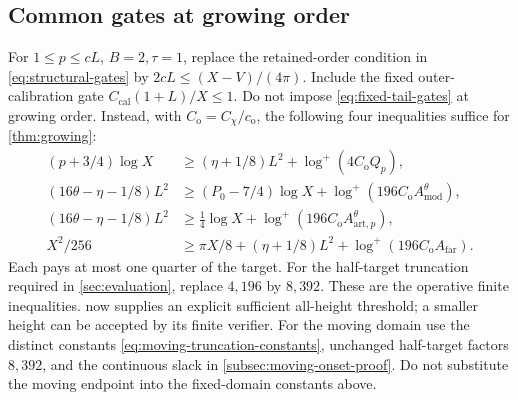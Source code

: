 \subsection{Common gates at growing order}
\label{app:growing-gates}
For \(1\le p\le cL\), \(B=2,\tau=1\), replace the retained-order
condition in \eqref{eq:structural-gates} by
\(2cL\le(X-V)/(4\pi)\).
Include the fixed outer-calibration gate
\(C_{\mathrm{cal}}(1+L)/X\le1\).
Do not impose \eqref{eq:fixed-tail-gates} at growing order.
Instead, with \(C_{\mathrm o}=C_\chi/c_{\mathrm o}\), the following
four inequalities suffice for \cref{thm:growing}:
\begin{subequations}\label{eq:growing-gates}
\begin{align}
 (p+3/4)\log X
 &\ge(\eta+1/8)L^2+\log^+(4C_{\mathrm o}Q_p),\\
 (16\theta-\eta-1/8)L^2
 &\ge(P_0-7/4)\log X+
                   \log^+(196C_{\mathrm o}A_{\mathrm{mod}}^\theta),\\
 (16\theta-\eta-1/8)L^2
 &\ge\tfrac14\log X+
                   \log^+(196C_{\mathrm o}A_{\mathrm{art},p}^\theta),\\
 X^2/256
 &\ge\pi X/8+(\eta+1/8)L^2+
                   \log^+(196C_{\mathrm o}A_{\mathrm{far}}).
\end{align}
\end{subequations}
Each pays at most one quarter of the target.
For the half-target truncation required in
\cref{sec:evaluation}, replace \(4,196\) by \(8,392\).
These are the operative finite inequalities.
 now supplies an explicit sufficient all-height
threshold; a smaller height can be accepted by its finite verifier.
For the moving domain use the distinct constants
\eqref{eq:moving-truncation-constants}, unchanged half-target factors
\(8,392\), and the continuous slack in
\cref{subsec:moving-onset-proof}. Do not substitute the moving endpoint
into the fixed-domain constants above.

